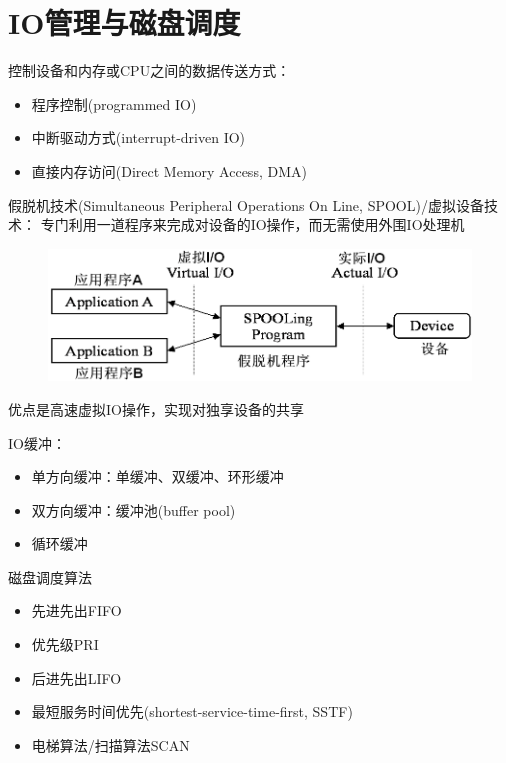 
\section{IO管理与磁盘调度}
控制设备和内存或CPU之间的数据传送方式：
\begin{itemize}
    \item 程序控制(programmed IO)
    \item 中断驱动方式(interrupt-driven IO)
    \item 直接内存访问(Direct Memory Access, DMA)
\end{itemize}

假脱机技术(Simultaneous Peripheral Operations On Line, SPOOL)/虚拟设备技术：
专门利用一道程序来完成对设备的IO操作，而无需使用外围IO处理机
\begin{figure}[H]
    \centering
    \includegraphics[width=0.7\linewidth]{fig/SPOOLing.png}
\end{figure}
优点是高速虚拟IO操作，实现对独享设备的共享

IO缓冲：
\begin{itemize}
    \item 单方向缓冲：单缓冲、双缓冲、环形缓冲
    \item 双方向缓冲：缓冲池(buffer pool)
    \item 循环缓冲
\end{itemize}

磁盘调度算法
\begin{itemize}
    \item 先进先出FIFO
    \item 优先级PRI
    \item 后进先出LIFO
    \item 最短服务时间优先(shortest-service-time-first, SSTF)
    \item 电梯算法/扫描算法SCAN
\end{itemize}